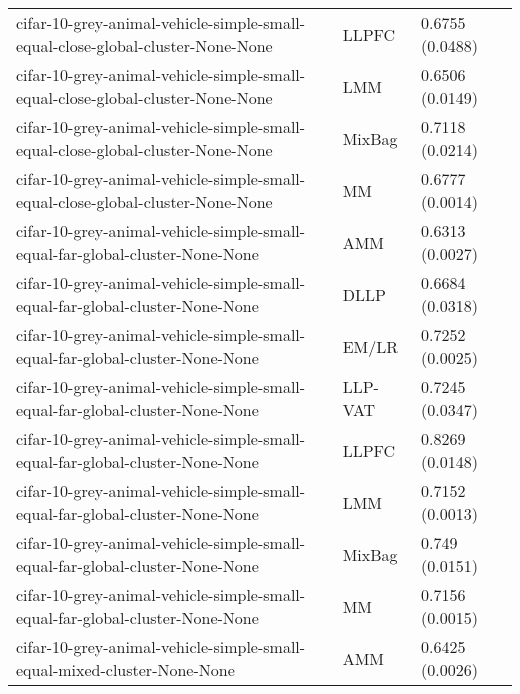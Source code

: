 \begin{longtable}{lll}
                               cifar-10-grey-animal-vehicle-simple-small-equal-close-global-cluster-None-None &     LLPFC &                           0.6755 (0.0488) \\
                               cifar-10-grey-animal-vehicle-simple-small-equal-close-global-cluster-None-None &       LMM &                           0.6506 (0.0149) \\
                               cifar-10-grey-animal-vehicle-simple-small-equal-close-global-cluster-None-None &    MixBag &                           0.7118 (0.0214) \\
                               cifar-10-grey-animal-vehicle-simple-small-equal-close-global-cluster-None-None &        MM &                           0.6777 (0.0014) \\
                                 cifar-10-grey-animal-vehicle-simple-small-equal-far-global-cluster-None-None &       AMM &                           0.6313 (0.0027) \\
                                 cifar-10-grey-animal-vehicle-simple-small-equal-far-global-cluster-None-None &      DLLP &                           0.6684 (0.0318) \\
                                 cifar-10-grey-animal-vehicle-simple-small-equal-far-global-cluster-None-None &     EM/LR &                           0.7252 (0.0025) \\
                                 cifar-10-grey-animal-vehicle-simple-small-equal-far-global-cluster-None-None &   LLP-VAT &                           0.7245 (0.0347) \\
                                 cifar-10-grey-animal-vehicle-simple-small-equal-far-global-cluster-None-None &     LLPFC &                           0.8269 (0.0148) \\
                                 cifar-10-grey-animal-vehicle-simple-small-equal-far-global-cluster-None-None &       LMM &                           0.7152 (0.0013) \\
                                 cifar-10-grey-animal-vehicle-simple-small-equal-far-global-cluster-None-None &    MixBag &                            0.749 (0.0151) \\
                                 cifar-10-grey-animal-vehicle-simple-small-equal-far-global-cluster-None-None &        MM &                           0.7156 (0.0015) \\
                                      cifar-10-grey-animal-vehicle-simple-small-equal-mixed-cluster-None-None &       AMM &                           0.6425 (0.0026) \\

\end{longtable}
